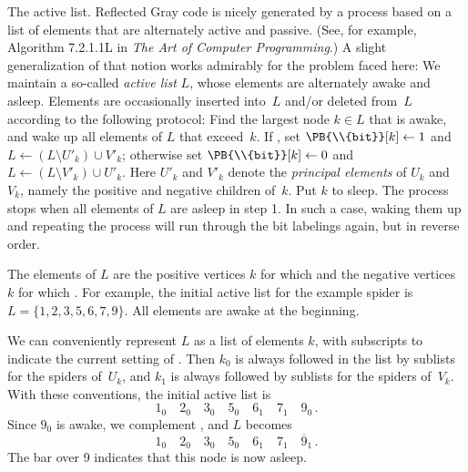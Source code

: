 The active list. Reflected Gray code is nicely
generated by a process
based on a list of elements that are alternately active and passive.
(See, for example, Algorithm 7.2.1.1L in {\sl The Art of Computer
Programming}.) A slight generalization of that notion works admirably for the
problem faced here: We maintain a so-called {\it active list\/} $L$, whose
elements are alternately awake and asleep. Elements are occasionally inserted
into~$L$ and/or deleted from~$L$ according to the following protocol:
\smallskip
{} Find the largest node $k\in L$ that is awake, and wake up
all elements of $L$ that exceed~$k$.
 If , set $\PB{\\{bit}}[k]\gets1$ and
$L\gets(L\setminus U'_k)\cup V'_k$; otherwise set $\PB{\\{bit}}[k]\gets0$ and
$L\gets(L\setminus V'_k)\cup U'_k$. Here $U'_k$ and $V'_k$ denote the
{\it principal elements\/} of $U_k$ and $V_k$, namely the positive
and negative children of~$k$.
 Put $k$ to sleep.
\smallskip\noindent
The process stops when all elements of $L$ are asleep in step 1. In such a
case, waking them up and repeating the process will run through the
bit labelings again, but in reverse order.

The elements of $L$ are the positive vertices $k$ for which 
and the negative vertices $k$ for which .
For example, the initial active list for the example spider
is $L=\{1,2,3,5,6,7,9\}$. All elements are awake at the beginning.

\def\p#1{\overline#1}
We can conveniently represent $L$ as a list of elements $k$, with
subscripts to indicate the current setting of . Then $k_0$ is
always followed in the list by sublists for the spiders of~$U_k$, and
$k_1$ is always followed by sublists for the spiders of~$V_k$. With
these conventions, the initial active list is
$$1_0\quad 2_0\quad 3_0\quad 5_0\quad 6_1\quad 7_1\quad 9_0\,.$$
Since $9_0$ is awake, we complement , and $L$ becomes
$$1_0\quad 2_0\quad 3_0\quad 5_0\quad 6_1\quad 7_1\quad \p9_1\,.$$
The bar over 9 indicates that this node is now asleep.


